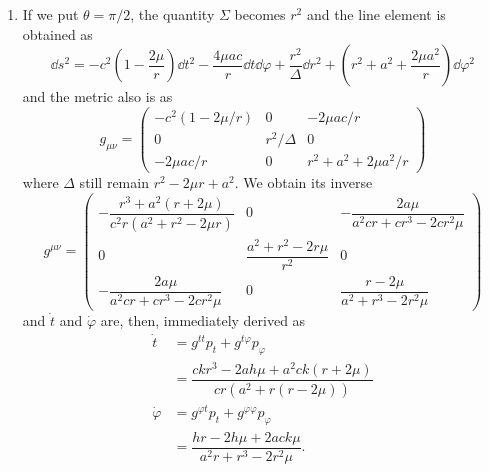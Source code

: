 \documentclass[a4paper,pdftex,10pt]{article}
\begin{document}
\maketitle

\begin{enumerate}
  \item
        If we put $\theta=\pi/2$, the quantity $\Sigma$ becomes $r^2$ and the line element is obtained as
        \begin{equation}
          \dd s^2
          =
          -
          c^2
          \left( 1-\frac{2\mu}{r} \right)\dd t^2
          -
          \frac{4\mu ac}{r}\dd t\dd \varphi
          +
          \frac{r^2}{\Delta}\dd r^2
          +
          \left(
          r^2+a^2+\frac{2\mu a^2}{r}
          \right)
          \dd\varphi^2
        \end{equation}
        and the metric also is as
        \begin{equation}
          g_{\mu\nu}
          =
          \begin{pmatrix}
            -c^2(1-2\mu/r) & 0          & -2\mu ac/r           \\
            0              & r^2/\Delta & 0                    \\
            -2\mu ac/r     & 0          & r^2 + a^2 +2\mu a^2/r
          \end{pmatrix}
        \end{equation}
        where $\Delta$ still remain $r^2-2\mu r+a^2$. We obtain its inverse
        \begin{equation}
          g^{\mu\nu}
          =
          \begin{pmatrix}
            -\dfrac{r^3+a^2(r+2\mu)}{c^2 r(a^2+r^2-2\mu r)} & 0 & -\dfrac{2a\mu}{a^2 cr+cr^3-2cr^2\mu} \\
            0 & \dfrac{a^2+r^2-2r\mu}{r^2} & 0 \\
            -\dfrac{2a\mu}{a^2cr+cr^3-2cr^2\mu} & 0 & \dfrac{r-2\mu}{a^2+r^3-2r^2\mu}
          \end{pmatrix}
          \label{eqn:inverse_metric}
        \end{equation}
        and $\dot{t}$ and $\dot{\varphi}$ are, then, immediately derived as
        \begin{align}
          \dot{t}
          &=
          g^{tt}p_{t}+g^{t\varphi}p_{\varphi}
          \nonumber
          \\
          &=
          \dfrac{ckr^3-2ah\mu+a^2 ck(r+2\mu)}{cr(a^2+r(r-2\mu))}
          \\
          \dot{\varphi}
          &=
          g^{\varphi t}p_{t}+g^{\varphi\varphi}p_{\varphi}
          \nonumber
          \\
          &=
          \dfrac{hr-2h\mu+2ack\mu}{a^2r+r^3-2r^2\mu}
          .
        \end{align}



\end{enumerate}
\end{document}
